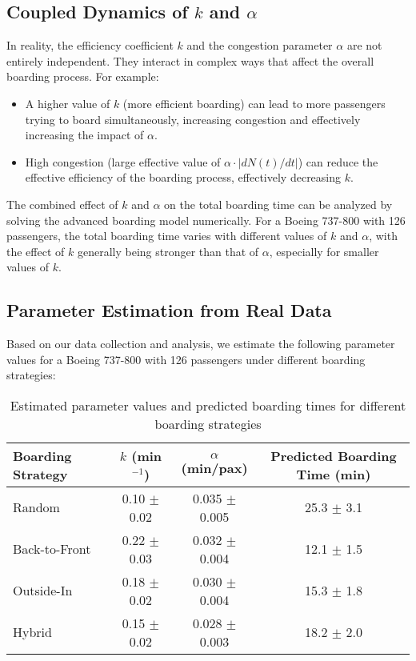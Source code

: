 \documentclass[12pt,a4paper]{article}
\begin{document}
\subsection{Coupled Dynamics of $k$ and $\alpha$}

In reality, the efficiency coefficient $k$ and the congestion parameter $\alpha$ are not entirely independent. They interact in complex ways that affect the overall boarding process. For example:

\begin{itemize}
    \item A higher value of $k$ (more efficient boarding) can lead to more passengers trying to board simultaneously, increasing congestion and effectively increasing the impact of $\alpha$.
    \item High congestion (large effective value of $\alpha \cdot |dN(t)/dt|$) can reduce the effective efficiency of the boarding process, effectively decreasing $k$.
\end{itemize}

The combined effect of $k$ and $\alpha$ on the total boarding time can be analyzed by solving the advanced boarding model numerically. For a Boeing 737-800 with 126 passengers, the total boarding time varies with different values of $k$ and $\alpha$, with the effect of $k$ generally being stronger than that of $\alpha$, especially for smaller values of $k$.

\subsection{Parameter Estimation from Real Data}

Based on our data collection and analysis, we estimate the following parameter values for a Boeing 737-800 with 126 passengers under different boarding strategies:

\begin{table}[H]
\centering
\begin{tabular}{|l|c|c|c|}
\hline
\textbf{Boarding Strategy} & \textbf{$k$ (min$^{-1}$)} & \textbf{$\alpha$ (min/pax)} & \textbf{Predicted Boarding Time (min)} \\ \hline
Random & 0.10 $\pm$ 0.02 & 0.035 $\pm$ 0.005 & 25.3 $\pm$ 3.1 \\ \hline
Back-to-Front & 0.22 $\pm$ 0.03 & 0.032 $\pm$ 0.004 & 12.1 $\pm$ 1.5 \\ \hline
Outside-In & 0.18 $\pm$ 0.02 & 0.030 $\pm$ 0.004 & 15.3 $\pm$ 1.8 \\ \hline
Hybrid & 0.15 $\pm$ 0.02 & 0.028 $\pm$ 0.003 & 18.2 $\pm$ 2.0 \\ \hline
\end{tabular}
\caption{Estimated parameter values and predicted boarding times for different boarding strategies}
\label{tab:parameter_estimates}
\end{table}
\end{document}
